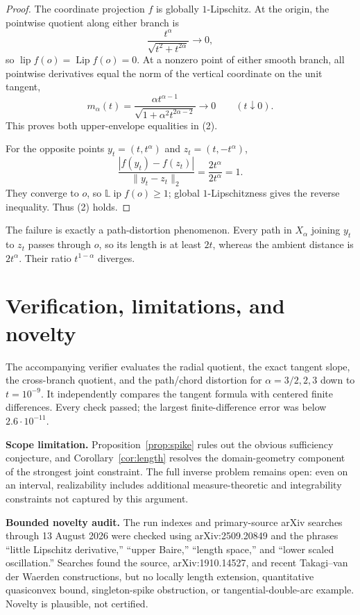 \documentclass[11pt]{article}
\theoremstyle{definition}
\newcommand{\lipf}{\operatorname{lip}}
\newcommand{\Lipf}{\operatorname{Lip}}
\newcommand{\LLip}{\mathbb L\!\operatorname{ip}}
\begin{document}
\begin{proof}
The coordinate projection $f$ is globally $1$-Lipschitz.  At the origin,
the pointwise quotient along either branch is
\[
 \frac{t^\alpha}{\sqrt{t^2+t^{2\alpha}}}\longrightarrow0,
\]
so $\lipf f(o)=\Lipf f(o)=0$.  At a nonzero point of either smooth branch,
all pointwise derivatives equal the norm of the vertical coordinate on the
unit tangent,
\[
 m_\alpha(t)=\frac{\alpha t^{\alpha-1}}
 {\sqrt{1+\alpha^2t^{2\alpha-2}}}\longrightarrow0
 \qquad(t\downarrow0).
\]
This proves both upper-envelope equalities in (2).

For the opposite points $y_t=(t,t^\alpha)$ and
$z_t=(t,-t^\alpha)$,
\[
 \frac{|f(y_t)-f(z_t)|}{\|y_t-z_t\|_2}
 =\frac{2t^\alpha}{2t^\alpha}=1.
\]
They converge to $o$, so $\LLip f(o)\geq1$; global $1$-Lipschitzness gives
the reverse inequality.  Thus (2) holds.
\end{proof}

The failure is exactly a path-distortion phenomenon.  Every path in
$X_\alpha$ joining $y_t$ to $z_t$ passes through $o$, so its length is at
least $2t$, whereas the ambient distance is $2t^\alpha$.  Their ratio
$t^{1-\alpha}$ diverges.

\section{Verification, limitations, and novelty}

The accompanying verifier evaluates the radial quotient, the exact tangent
slope, the cross-branch quotient, and the path/chord distortion for
$\alpha=3/2,2,3$ down to $t=10^{-9}$.  It independently compares the tangent
formula with centered finite differences.  Every check passed; the largest
finite-difference error was below $2.6\cdot10^{-11}$.

\textbf{Scope limitation.}  Proposition~\ref{prop:spike} rules out the
obvious sufficiency conjecture, and Corollary~\ref{cor:length} resolves the
domain-geometry component of the strongest joint constraint.  The full
inverse problem remains open: even on an interval, realizability includes
additional measure-theoretic and integrability constraints not captured by
this argument.

\textbf{Bounded novelty audit.}  The run indexes and primary-source arXiv
searches through 13 August 2026 were checked using arXiv:2509.20849 and the
phrases ``little Lipschitz derivative,'' ``upper Baire,'' ``length space,''
and ``lower scaled oscillation.''  Searches found the source,
arXiv:1910.14527, and recent Takagi--van der Waerden constructions, but no
locally length extension, quantitative quasiconvex bound, singleton-spike
obstruction, or tangential-double-arc example.  Novelty is plausible, not
certified.
\end{document}
